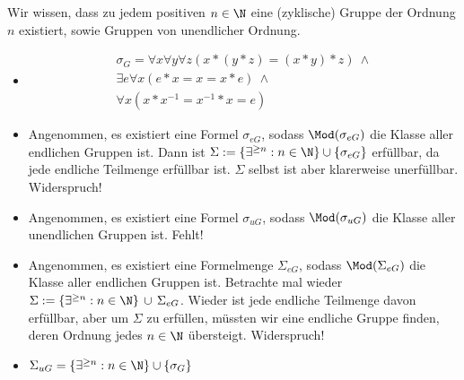 \begin{solution}
Wir wissen, dass zu jedem positiven $n \in \N$ eine (zyklische) Gruppe der Ordnung $n$
existiert, sowie Gruppen von unendlicher Ordnung.
\begin{itemize}
  \item
  \begin{align*}
    \sigma_G = \forall x \forall y \forall z (x*(y*z) = (x*y)*z)\ \land \\
    \exists e \forall x (e*x = x = x*e)\ \land \\
    \forall x (x * x^{-1} = x^{-1} * x = e)
  \end{align*}
  \item Angenommen, es existiert eine Formel $\sigma_{eG}$, sodass $\Mod(\sigma_{eG})$
  die Klasse aller endlichen Gruppen ist. Dann ist $\Sigma := \{\exists^{\geq n}: n \in \N\} \cup \{\sigma_{eG}\}$ erfüllbar, da jede endliche Teilmenge erfüllbar ist.
  $\Sigma$ selbst ist aber klarerweise unerfüllbar. Widerspruch!
  \item Angenommen, es existiert eine Formel $\sigma_{uG}$, sodass $\Mod(\sigma_{uG})$ die Klasse aller unendlichen Gruppen ist. Fehlt!
  \item Angenommen, es existiert eine Formelmenge $\Sigma_{eG}$, sodass $\Mod(\Sigma_{eG})$
  die Klasse aller endlichen Gruppen ist.
  Betrachte mal wieder $\Sigma := \{\exists^{\geq n}: n \in \N\}\, \cup\, \Sigma_{eG}$.
  Wieder ist jede endliche Teilmenge davon erfüllbar, aber um $\Sigma$ zu erfüllen,
  müssten wir eine endliche Gruppe finden, deren Ordnung jedes $n \in \N$ übersteigt.
  Widerspruch!
  \item $\Sigma_{uG} = \{\exists^{\geq n}: n \in \N\} \cup \{\sigma_G\}$
\end{itemize}

\end{solution}

